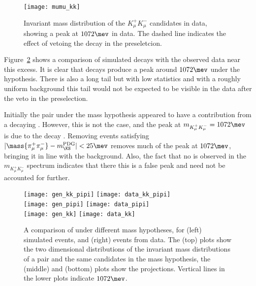 \begin{figure}
  \begin{center}
    \texttt{[image: mumu\_kk]}
    \caption[Invariant mass of the \mumu distribution under the \kk mass hypotheses]
    {
      Invariant mass distribution of the $K_\mu^+K_\mu^-$ candidates in data, showing a peak at
      \approx$1072\mev$ in data.
      The dashed line indicates the effect of vetoing the decay
      \decay{\KS}{\pip\pim} in the preseletcion.
    }
    \label{fig:x1070}
  \end{center}
\end{figure}

Figure~\ref{fig:db:x1070:2d} shows a comparison of simulated \decay{\KS}{\pipi} decays with the
observed data near this excess.
It is clear that \decay{\KS}{\pipi} decays produce a peak around $1072\mev$ under the \kk
hypothesis.
There is also a long tail but with low statistics and with a roughly uniform
background this tail would not be expected to be visible in the data after the \KS veto in the
preselection.

Initially the \mumu pair under the \kk mass hypothesis appeared to have a contribution from a
decaying \xtsvty.
However, this is not the case, and the peak at $m_{K^+_\mu K^-_\mu}=1072\mev$ is due to the decay
\decay{\KS}{\pipi}.
Removing events satisfying $|\mass{\pi_\mu^+\pi_\mu^-}-m_{\KS}^\mathrm{PDG}|<25\mev$ removes much
of the peak at $1072\mev$, bringing it in line with the background.
Also, the fact that no \decay{\phi}{\kk} is observed in the $m_{K^+_\mu K^-_\mu}$ spectrum
indicates that there this is a false peak and need not be accounted for further.


\begin{figure}
  \begin{center}
    \texttt{[image: gen\_kk\_pipi]}
    \texttt{[image: data\_kk\_pipi]}\\
    \texttt{[image: gen\_pipi]}
    \texttt{[image: data\_pipi]}\\
    \texttt{[image: gen\_kk]}
    \texttt{[image: data\_kk]}
    \caption[Analysis of the \decay{\KS}{\pipi} background under the \kk mass hypothesis]
    {
      A comparison of \decay{\KS}{\pi\pi} under different mass hypotheses, for
      (left) simulated events, and
      (right) events from data.
      The (top) plots show the two dimensional distributions of the invariant mass distributions of
      a \pipi pair and the same candidates in the \kk mass hypothesis, the (middle) and (bottom)
      plots show the projections.
      Vertical lines in the lower plots indicate $1072\mev$.
    }
    \label{fig:db:x1070:2d}
  \end{center}
\end{figure}


